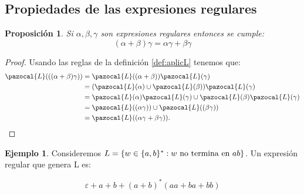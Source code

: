 \documentclass[fleqn, 10pt]{article}
\newcommand{\Lb}{\pazocal{L}}
\theoremstyle{plain}
\newtheorem{proposicion}{Proposición}
\theoremstyle{definition}
\newtheorem{example}{Ejemplo}[section]
\begin{document}
\subsection{Propiedades de las expresiones regulares}
\begin{proposicion}
Si $\alpha,\beta,\gamma$ son expresiones regulares entonces se cumple:
  \begin{equation}
  (\alpha+\beta)\gamma=\alpha\gamma+\beta\gamma
  \end{equation}
\end{proposicion}
\begin{proof}
Usando las reglas de la definición \ref{def:aplicL} tenemos que:
\begin{align*}
\Lb(((\alpha+\beta)\gamma))
  &= \Lb((\alpha+\beta))\Lb(\gamma) \\
  &= (\Lb(\alpha)\cup \Lb(\beta))\Lb(\gamma) \\
  &= \Lb(\alpha)\Lb(\gamma)\cup \Lb(\beta)\Lb(\gamma) \\
  &= \Lb((\alpha\gamma))\cup \Lb((\beta\gamma)) \\
  &= \Lb((\alpha\gamma+\beta\gamma)).
\end{align*}
\end{proof}

\begin{example}
Consideremos $L=\{w\in \{a,b\}^* : w \textnormal{ no termina en } ab\}$. Un expresión regular que genera L es: \\
\begin{ceqn}
  \[
  \varepsilon + a + b + (a+b)^*(aa+ba+bb)
  \]
\end{ceqn}

\end{example}
\end{document}
